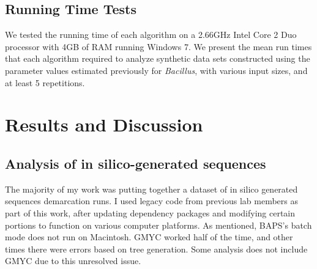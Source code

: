 \subsection*{Running Time Tests}
We tested the running time of each algorithm on a 2.66GHz Intel Core 2 Duo processor with 4GB of RAM running Windows 7.
We present the mean run times that each algorithm required to analyze synthetic data sets constructed using the parameter values estimated previously for \emph{Bacillus}, with various input sizes, and at least 5 repetitions.

\section{Results and Discussion}


\subsection*{Analysis of in silico-generated sequences}
The majority of my work was putting together a dataset of in silico generated sequences demarcation runs.
I used legacy code from previous lab members as part of this work, after updating dependency packages and modifying certain portions to function on various computer platforms.
As mentioned, BAPS's batch mode does not run on Macintosh.
GMYC worked half of the time, and other times there were errors based on tree generation.
Some analysis does not include GMYC due to this unresolved issue.

